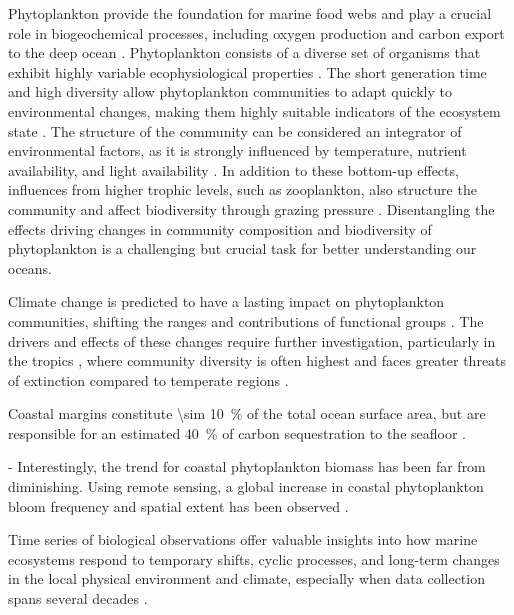     Phytoplankton provide the foundation for marine food webs and play a crucial role in biogeochemical processes, including oxygen production and carbon export to the deep ocean \cite{falkowski_biogeochemical_1998}.
    Phytoplankton consists of a diverse set of organisms that exhibit highly variable ecophysiological properties \cite{appeltans_magnitude_2012}. The short generation time and high diversity allow phytoplankton communities to adapt quickly to environmental changes, making them highly suitable indicators of the ecosystem state \cite{alvarez-cobelas_what_1998, barton_anthropogenic_2016, di_cavalho_temporal_2023}.
    The structure of the community can be considered an integrator of environmental factors, as it is strongly influenced by temperature, nutrient availability, and light availability \cite{mouw_phytoplankton_2016}. In addition to these bottom-up effects, influences from higher trophic levels, such as zooplankton, also structure the community and affect biodiversity through grazing pressure \cite{banas_adding_2011}. Disentangling the effects driving changes in community composition and biodiversity of phytoplankton is a challenging but crucial task for better understanding our oceans.

    
    Climate change is predicted to have a lasting impact on phytoplankton communities, shifting the ranges and contributions of functional groups \cite{henson_future_2021}. The drivers and effects of these changes require further investigation, particularly in the tropics \cite{clarke_does_2017}, where community diversity is often highest \cite{brown_why_2014, righetti_global_2019} and faces greater threats of extinction compared to temperate regions \cite{finnegan_paleontological_2015}.
    
    Coastal margins constitute \qty{\sim 10}{\%} of the total ocean surface area, but are responsible for an estimated \qty{40}{\%} of carbon sequestration to the seafloor \cite{yool_examination_2001, mullerkarger_importance_2005}.
    
    - Interestingly, the trend for coastal phytoplankton biomass has been far from diminishing.
    Using remote sensing, a global increase in coastal phytoplankton bloom frequency and spatial extent has been observed \cite{dai_coastal_2023}.

    Time series of biological observations offer valuable insights into how marine ecosystems respond to temporary shifts, cyclic processes, and long-term changes in the local physical environment and climate, especially when data collection spans several decades \cite{carstensen_need_2014, henson_observing_2016}. 

